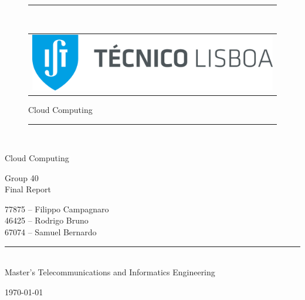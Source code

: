 \newcommand{\HRule}{\rule{\linewidth}{0.5mm}}

\graphicspath{{./Images/}}
%
\begin{figure}[H]	
	\HRule\\[0.4cm]
	\begin{tabular}{c}
		\includegraphics[scale=0.5]{Logo_IST}   \\  
	\end{tabular} 	
	\centering
	\vspace{0.5cm}
	\hspace{2.5cm}\huge{Cloud Computing} \vspace{0.4cm}
	\HRule\\[1cm]
\end{figure}
%  
\begin{center} 
%	  
	  \begin{LARGE}
	  
	  Cloud Computing
%	  
	  \end{LARGE}
	  
	  \vspace{3cm}
	  \begin{LARGE}
	  	Group 40
	  	\\
	  	\vspace{0.2cm}
	  	Final Report
	  \end{LARGE}
	  \vspace{1cm}
	  
	  \begin{Large}
		  77875 – Filippo Campagnaro  \\ 
		  \vspace{0.2cm}
		  46425 – Rodrigo Bruno   \\
		  \vspace{0.2cm}
		  67074 – Samuel Bernardo   \\
		  \vspace{0.2cm}

	  \end{Large}
	  
	  \vspace{0.3cm}
	  \HRule\\[0.4cm]
	  Master's Telecommunications and Informatics Engineering
	  
	  \today
  
\end{center}
\thispagestyle{empty}



